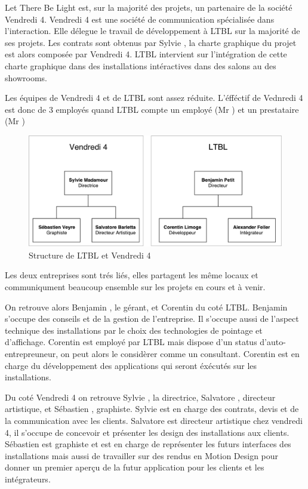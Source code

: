 \documentclass{article}
\begin{document}
Let There Be Light est, sur la majorité des projets, un partenaire de la société Vendredi 4.
Vendredi 4 est une société de communication spécialisée dans l'interaction.
Elle délegue le travail de développement à LTBL sur la majorité de ses projets.
Les contrats sont obtenus par Sylvie , la charte graphique du projet est alors composée par Vendredi 4.
LTBL intervient sur l'intégration de cette charte graphique dans des installations intéractives dans des salons au des showrooms.

Les équipes de Vendredi 4 et de LTBL sont assez réduite.
L'éfféctif de Vednredi 4 est donc de 3 employés quand LTBL compte un employé (Mr ) et un prestataire (Mr )

\begin{figure}[h]
    \centering
    \includegraphics[scale=0.7]{Structure-LTBL.pdf}
    \caption{Structure de LTBL et Vendredi 4}
\end{figure}

Les deux entreprises sont trés liés, elles partagent les même locaux et communiqument beaucoup ensemble sur les projets en cours et à venir.

On retrouve alors Benjamin , le gérant, et Corentin  du coté LTBL.
Benjamin s'occupe des conseils et de la gestion de l'entreprise.
Il s'occupe aussi de l'aspect technique des installations par le choix des technologies de pointage et d'affichage.
Corentin est employé par LTBL mais dispose d'un status d'auto-entrepreuneur, on peut alors le considèrer comme un consultant.
Corentin est en charge du développement des applications qui seront éxécutés sur les installations.

Du coté Vendredi 4 on retrouve Sylvie , la directrice, Salvatore , directeur artistique, et Sébastien , graphiste.
Sylvie est en charge des contrats, devis et de la communication avec les clients.
Salvatore est directeur artistique chez vendredi 4, il s'occupe de concevoir et présenter les design des installations aux clients.
Sébastien est graphiste et est en charge de représenter les futurs interfaces des installations mais aussi de travailler sur des rendus en Motion Design pour donner un premier aperçu de la futur application pour les clients et les intégrateurs.
\end{document}
